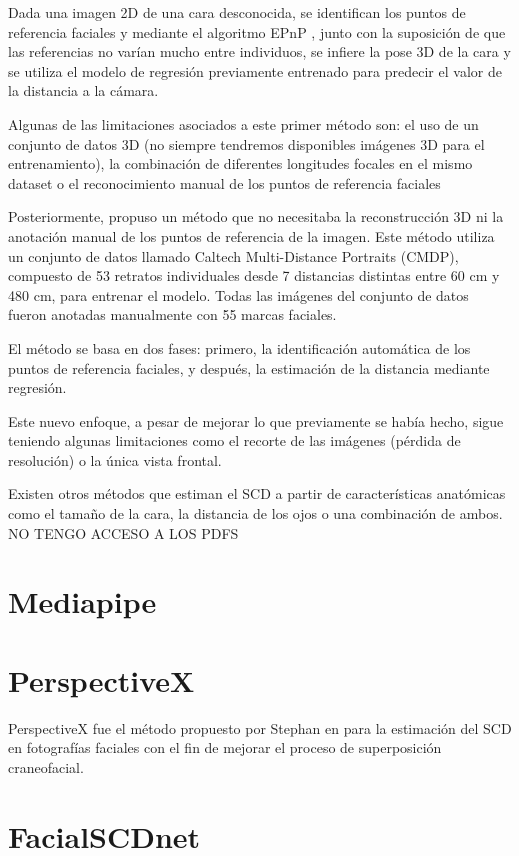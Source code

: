 Dada una imagen 2D de una cara desconocida, se identifican los puntos de referencia faciales y mediante el algoritmo EPnP \cite{29}, junto con la suposición de que las referencias no varían mucho entre individuos, se infiere la pose 3D de la cara y se utiliza el modelo de regresión previamente entrenado para predecir el valor de la distancia a la cámara.

Algunas de las limitaciones asociados a este primer método son: el uso de un conjunto de datos 3D (no siempre tendremos disponibles imágenes 3D para el entrenamiento), la combinación de diferentes longitudes focales en el mismo dataset o el reconocimiento manual de los puntos de referencia faciales

Posteriormente, \cite{30} propuso un método que no necesitaba la reconstrucción 3D ni la anotación manual de los puntos de referencia de la imagen. Este método utiliza un conjunto de datos llamado Caltech Multi-Distance Portraits (CMDP), compuesto de 53 retratos individuales desde 7 distancias distintas entre 60 cm y 480 cm, para entrenar el modelo. Todas las imágenes del conjunto de datos fueron anotadas manualmente con 55 marcas faciales. 

El método se basa en dos fases: primero, la identificación automática de los puntos de referencia faciales, y después, la estimación de la distancia mediante regresión.

Este nuevo enfoque, a pesar de mejorar lo que previamente se había hecho, sigue teniendo algunas limitaciones como el recorte de las imágenes (pérdida de resolución) o la única vista frontal.

Existen otros métodos que estiman el SCD a partir de características anatómicas como el tamaño de la cara, la distancia de los ojos o una combinación de ambos. NO TENGO ACCESO A LOS PDFS

\section{Mediapipe}


\section{PerspectiveX}

PerspectiveX fue el método propuesto por Stephan en \cite{31} para la estimación del SCD en fotografías faciales con el fin de mejorar el proceso de superposición craneofacial.

\section{FacialSCDnet}


